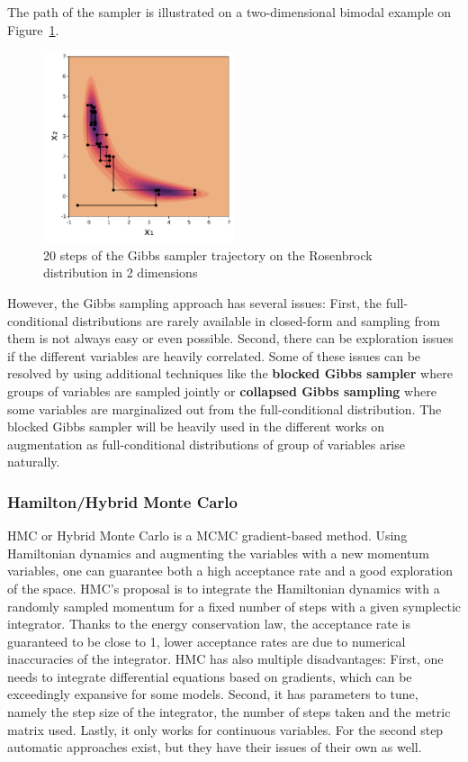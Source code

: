 The path of the sampler is illustrated on a two-dimensional bimodal example on Figure~\ref{fig:gibbs_samp}.

\begin{figure}
\centering
\includegraphics[width=0.5\textwidth]{./chapters/2_background/figures/gibbs_sampling.pdf}
\caption{20 steps of the Gibbs sampler trajectory on the Rosenbrock distribution in 2 dimensions}
\label{fig:gibbs_samp}
\end{figure}

However, the Gibbs sampling approach has several issues:
First, the full-conditional distributions are rarely available in closed-form and sampling from them is not always easy or even possible.
Second, there can be exploration issues if the different variables are heavily correlated.
Some of these issues can be resolved by using additional techniques like the \textbf{blocked Gibbs sampler} \needcite where groups of variables are sampled jointly or \textbf{collapsed Gibbs sampling} \cite{liu1994collapsed} where some variables are marginalized out from the full-conditional distribution.
The blocked Gibbs sampler will be heavily used in the different works on augmentation as full-conditional distributions of group of variables arise naturally.

\subsubsection{Hamilton/Hybrid Monte Carlo}
\label{sec:hmc}
\acf{HMC} or Hybrid Monte Carlo \cite{betancourt2017conceptual} is a \ac{MCMC} gradient-based method.
Using Hamiltonian dynamics and augmenting the variables with a new momentum variables, one can guarantee both a high acceptance rate and a good exploration of the space.
\ac{HMC}'s proposal is to integrate the Hamiltonian dynamics with a randomly sampled momentum for a fixed number of steps with a given symplectic integrator.
Thanks to the energy conservation law, the acceptance rate is guaranteed to be close to 1, lower acceptance rates are due to numerical inaccuracies of the integrator.
\ac{HMC} has also multiple disadvantages: 
First, one needs to integrate differential equations based on gradients, which can be exceedingly expansive for some models.
Second, it has parameters to tune, namely the step size of the integrator, the number of steps taken and the metric matrix used.
Lastly, it only works for continuous variables.
For the second step automatic approaches exist, but they have their issues of their own as well.


